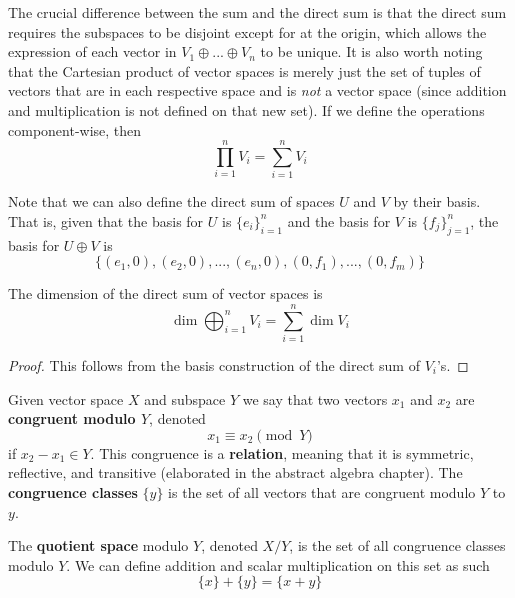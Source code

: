   The crucial difference between the sum and the direct sum is that the direct sum requires the subspaces to be disjoint except for at the origin, which allows the expression of each vector in $V_1 \oplus ... \oplus V_n$ to be unique. It is also worth noting that the Cartesian product of vector spaces is merely just the set of tuples of vectors that are in each respective space and is \textit{not} a vector space (since addition and multiplication is not defined on that new set). If we define the operations component-wise, then 
  \begin{equation}
    \prod_{i=1}^n V_i = \sum_{i=1}^n V_i
  \end{equation}

  Note that we can also define the direct sum of spaces $U$ and $V$ by their basis. That is, given that the basis for $U$ is $\{e_i\}_{i=1}^n$ and the basis for $V$ is $\{f_j\}_{j=1}^n$, the basis for $U \oplus V$ is
  \begin{equation}
    \{(e_1, 0), (e_2, 0), ..., (e_n, 0), (0, f_1), ..., (0, f_m)\}
  \end{equation}

  \begin{proposition}
    The dimension of the direct sum of vector spaces is 
    \begin{equation}
      \dim{\bigoplus_{i=1}^n V_i} = \sum_{i=1}^n \dim{V_i}
    \end{equation}
  \end{proposition}
  \begin{proof}
    This follows from the basis construction of the direct sum of $V_i$'s. 
  \end{proof}

  \begin{definition}
    Given vector space $X$ and subspace $Y$ we say that two vectors $x_1$ and $x_2$ are \textbf{congruent modulo $Y$}, denoted 
    \begin{equation}
      x_1 \equiv x_2 \pmod{Y}
    \end{equation}
    if $x_2 - x_1 \in Y$. This congruence is a \textbf{relation}, meaning that it is symmetric, reflective, and transitive (elaborated in the abstract algebra chapter). The \textbf{congruence classes} $\{ y\}$ is the set of all vectors that are congruent modulo $Y$ to $y$. 
  \end{definition}

  \begin{definition}
    The \textbf{quotient space} modulo $Y$, denoted $ X / Y$, is the set of all congruence classes modulo $Y$. We can define addition and scalar multiplication on this set as such 
    \begin{equation}
      \{ x\} + \{ y\} = \{ x + y\}
    \end{equation}
  \end{definition}

